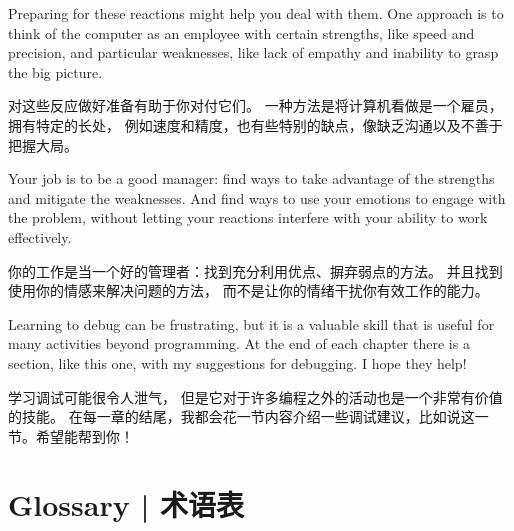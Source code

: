 Preparing for these reactions might help you deal with them.
One approach is to think of the computer as an employee with
certain strengths, like speed and precision, and
particular weaknesses, like lack of empathy and inability
to grasp the big picture.

对这些反应做好准备有助于你对付它们。 一种方法是将计算机看做是一个雇员，拥有特定的长处， 例如速度和精度，也有些特别的缺点，像缺乏沟通以及不善于把握大局。

Your job is to be a good manager: find ways to take advantage
of the strengths and mitigate the weaknesses.  And find ways
to use your emotions to engage with the problem,
without letting your reactions interfere with your ability
to work effectively.

你的工作是当一个好的管理者：找到充分利用优点、摒弃弱点的方法。 并且找到使用你的情感来解决问题的方法， 而不是让你的情绪干扰你有效工作的能力。

Learning to debug can be frustrating, but it is a valuable skill
that is useful for many activities beyond programming.  At the
end of each chapter there is a section, like this one,
with my suggestions for debugging.  I hope they help!

学习调试可能很令人泄气， 但是它对于许多编程之外的活动也是一个非常有价值的技能。 在每一章的结尾，我都会花一节内容介绍一些调试建议，比如说这一节。希望能帮到你！

\section{Glossary  |  术语表}

